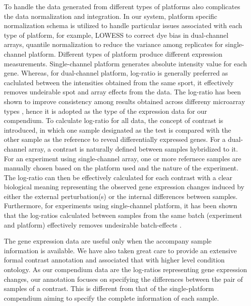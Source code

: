 To handle the data generated from different types of platforms also
complicates the data normalization and integration.
%
In our system, platform specific normalization schema is utilized to handle
particular issues associated with each type of platform, for example, LOWESS
to correct dye bias in dual-channel arrays, quantile normalization to reduce
the variance among replicates for single-channel platform.
%
Different types of platform produce different expression measurements.
Single-channel platform generates absolute intensity value for each gene.
Whereas, for dual-channel platform, log-ratio is generally preferred as
caclulated between the intensities obtained from the same sport, it
effectively removes undeirable spot and array effects from the data.
%
The log-ratio has been shown to improve consistency among results obtained
across differeny microarray types \cite{Shi2006}, hence it is adopted as
the type of the expression data for our compendium.
%
To calculate log-ratio for all data, the concept of contrast is introduced,
in which one sample designated as the test is compared with the other
sample as the reference to reveal differentially expressed genes.
%
For a dual-channel array, a contrast is naturally defined between samples
hybridized to it.
%
For an experiment using single-channel array, one or more refernece samples
are manually chosen based on the platform used and the nature of the
experiment.
%
The log-ratio can then be effectively calculated for each contrast with a
clear biological meaning representing the observed gene expression
changes induced by either the external perturbation(s) or the internal
differences between samples.
%
Furthermore, for experiments using single-channel platform, it has been shown
that the log-ratios calculated between samples from the same batch (experiment
and platform) effectively removes undesirable batch-effects \cite{Luo2010}.


The gene expression data are useful only when the accompany sample information
is available.  We have also taken great care to provide an extensive formal
contrast annotation and associated that with higher level condition ontology.
%
As our compendium data are the log-ratios representing gene expression
changes, our annotation focuses on specifying the differences between the pair
of samples of a contrast.
%
This is different from that of the single-platform compendium aiming to
specify the complete information of each sample.


